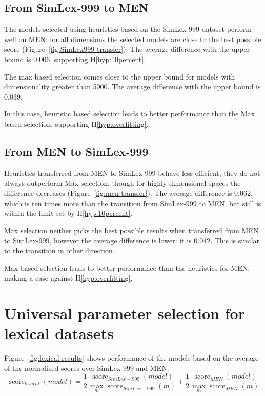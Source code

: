 \subsection{From SimLex-999 to MEN}



The models selected using heuristics based on the SimLex-999 dataset perform well on MEN: for all dimensions the selected models are close to the best possible score (Figure~\ref{fig:SimLex999-transfer}). The average difference with the upper bound is 0.006, supporting H\ref{hyp:10percent}.

The max based selection comes close to the upper bound for models with dimensionality greater than 5000. The average difference with the upper bound is 0.039.

In this case, heuristic based selection leads to better performance than the Max based selection, supporting H\ref{hyp:overfitting}.

\subsection{From MEN to SimLex-999}

Heuristics transferred from MEN to SimLex-999 behave less efficient, they do not always outperform Max selection, though for highly dimensional spaces the difference decreases (Figure~\ref{fig:men-transfer}). The average difference is 0.062, which is ten times more than the transition from SimLex-999 to MEN, but still is within the limit set by H\ref{hyp:10percent}.

Max selection neither picks the best possible results when transferred from MEN to SimLex-999, however the average difference is lower: it is 0.042. This is similar to the transition in other direction.

Max based selection leads to better performance than the heuristics for MEN, making a case against H\ref{hyp:overfitting}.

\section{Universal parameter selection for lexical datasets}
\label{sec:universal-lexical-param-selection}



Figure~\ref{fig:lexical-results} shows performance of the models based on the average of the normalised scores over SimLex-999 and MEN:
$$
\operatorname{score}_\mathit{lexical}(\mathit{model}) =%
\frac{1}{2}%
\frac{\operatorname{score}_\mathit{SimLex-999}(model)}%
{\max_m\operatorname{score}_\mathit{SimLex-999}(m)}%
+%
\frac{1}{2}%
\frac{\operatorname{score}_\mathit{MEN}(model)}%
{\max_m\operatorname{score}_\mathit{MEN}(m)}%
$$

